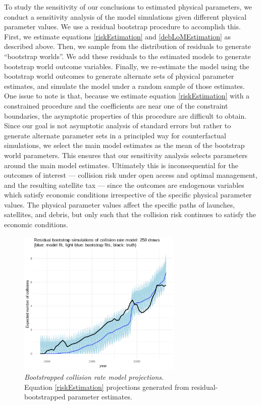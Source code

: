 \documentclass[12pt]{article}
\begin{document}
To study the sensitivity of our conclusions to estimated physical parameters, we conduct a sensitivity analysis of the model simulations given different physical parameter values. We use a residual bootstrap procedure to accomplish this. \\

First, we estimate equations \ref{riskEstimation} and \ref{debLoMEstimation} as described above. Then, we sample from the distribution of residuals to generate ``bootstrap worlds''. We add these residuals to the estimated models to generate bootstrap world outcome variables. Finally, we re-estimate the model using the bootstrap world outcomes to generate alternate sets of physical parameter estimates, and simulate the model under a random sample of those estimates. \\

One issue to note is that, because we estimate equation \ref{riskEstimation} with a constrained procedure and the coefficients are near one of the constraint boundaries, the asymptotic properties of this procedure are difficult to obtain. Since our goal is not asymptotic analysis of standard errors but rather to generate alternate parameter sets in a principled way for counterfactual simulations, we select the main model estimates as the mean of the bootstrap world parameters. This ensures that our sensitivity analysis selects parameters around the main model estimates. Ultimately this is inconsequential for the outcomes of interest --- collision risk under open access and optimal management, and the resulting satellite tax --- since the outcomes are endogenous variables which satisfy economic conditions irrespective of the specific physical parameter values. The physical parameter values affect the specific paths of launches, satellites, and debris, but only such that the collision risk continues to satisfy the economic conditions.

\begin{figure}[H]
	\centering
	\includegraphics[width=0.7\textwidth]{../../images/collision_rate_bootstrap_prediction_plot.png}
	\captionsetup{format=hang}
	\caption[Bootstrapped collision rate model projections]{\textit{Bootstrapped collision rate model projections.} \\
		Equation \ref{riskEstimation} projections generated from residual-bootstrapped parameter estimates.
	}
	\label{risk_eqn_prediction_bootstrap}
\end{figure}
\end{document}
